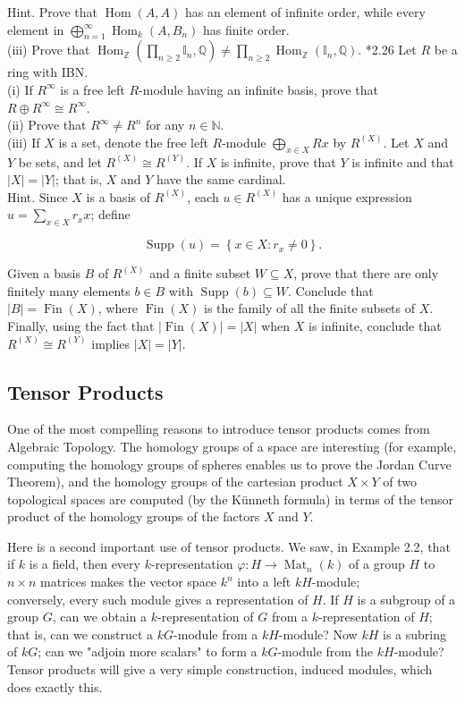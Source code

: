\documentclass[10pt]{article}
\begin{document}
Hint. Prove that $\operatorname{Hom}(A, A)$ has an element of infinite order, while every element in $\bigoplus_{n=1}^{\infty} \operatorname{Hom}_{k}\left(A, B_{n}\right)$ has finite order.\\
(iii) Prove that $\operatorname{Hom}_{\mathbb{Z}}\left(\prod_{n \geq 2} \mathbb{I}_{n}, \mathbb{Q}\right) \neq \prod_{n \geq 2} \operatorname{Hom}_{\mathbb{Z}}\left(\mathbb{I}_{n}, \mathbb{Q}\right)$. *2.26 Let $R$ be a ring with IBN.\\
(i) If $R^{\infty}$ is a free left $R$-module having an infinite basis, prove that $R \oplus R^{\infty} \cong R^{\infty}$.\\
(ii) Prove that $R^{\infty} \neq R^{n}$ for any $n \in \mathbb{N}$.\\
(iii) If $X$ is a set, denote the free left $R$-module $\bigoplus_{x \in X} R x$ by $R^{(X)}$. Let $X$ and $Y$ be sets, and let $R^{(X)} \cong R^{(Y)}$. If $X$ is infinite, prove that $Y$ is infinite and that $|X|=|Y|$; that is, $X$ and $Y$ have the same cardinal.\\
Hint. Since $X$ is a basis of $R^{(X)}$, each $u \in R^{(X)}$ has a unique expression $u=\sum_{x \in X} r_{x} x$; define

$$
\operatorname{Supp}(u)=\left\{x \in X: r_{x} \neq 0\right\} .
$$

Given a basis $B$ of $R^{(X)}$ and a finite subset $W \subseteq X$, prove that there are only finitely many elements $b \in B$ with $\operatorname{Supp}(b) \subseteq W$. Conclude that $|B|=\operatorname{Fin}(X)$, where $\operatorname{Fin}(X)$ is the family of all the finite subsets of $X$. Finally, using the fact that $|\operatorname{Fin}(X)|=|X|$ when $X$ is infinite, conclude that $R^{(X)} \cong R^{(Y)}$ implies $|X|=|Y|$.

\subsection*{Tensor Products}
One of the most compelling reasons to introduce tensor products comes from Algebraic Topology. The homology groups of a space are interesting (for example, computing the homology groups of spheres enables us to prove the Jordan Curve Theorem), and the homology groups of the cartesian product $X \times Y$ of two topological spaces are computed (by the Künneth formula) in terms of the tensor product of the homology groups of the factors $X$ and $Y$.

Here is a second important use of tensor products. We saw, in Example 2.2, that if $k$ is a field, then every $k$-representation $\varphi: H \rightarrow \operatorname{Mat}_{n}(k)$ of a group $H$ to $n \times n$ matrices makes the vector space $k^{n}$ into a left $k H$-module;\\
conversely, every such module gives a representation of $H$. If $H$ is a subgroup of a group $G$, can we obtain a $k$-representation of $G$ from a $k$-representation of $H$; that is, can we construct a $k G$-module from a $k H$-module? Now $k H$ is a subring of $k G$; can we "adjoin more scalars" to form a $k G$-module from the $k H$-module? Tensor products will give a very simple construction, induced modules, which does exactly this.
\end{document}
